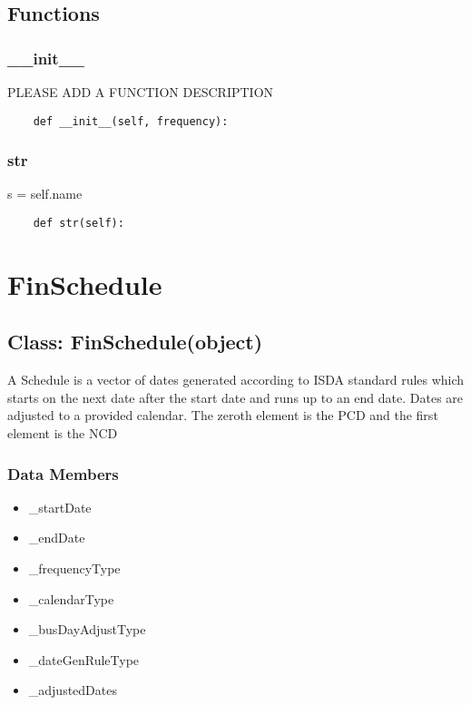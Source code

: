 \documentclass[twoside,11pt]{book}
\begin{document}
\subsection*{Functions}

\subsubsection*{{\bf \_\_init\_\_}}
PLEASE ADD A FUNCTION DESCRIPTION

\begin{lstlisting}
    def __init__(self, frequency):
\end{lstlisting}

\subsubsection*{{\bf str}}
s = self.name 

\begin{lstlisting}
    def str(self):
\end{lstlisting}

\newpage
\section{FinSchedule}

\subsection*{Class: FinSchedule(object)}
A Schedule is a vector of dates generated according to ISDA standard rules which starts on the next date after the start date and runs up to an end date. Dates are adjusted to a provided calendar. The zeroth element is the PCD and the first element is the NCD  

\subsubsection*{Data Members}
\begin{itemize}
\item{\_startDate}
\item{\_endDate}
\item{\_frequencyType}
\item{\_calendarType}
\item{\_busDayAdjustType}
\item{\_dateGenRuleType}
\item{\_adjustedDates}
\end{itemize}
\end{document}
